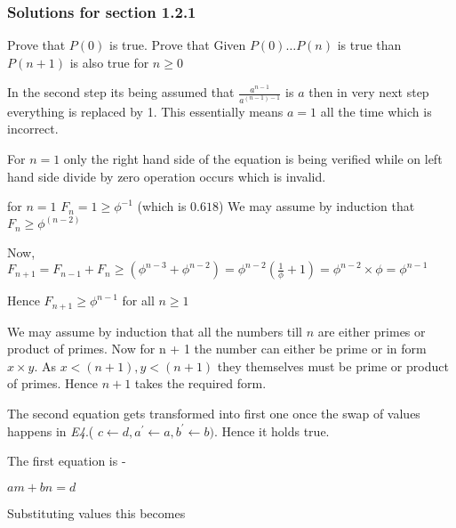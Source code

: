 \documentclass[12pt]{article}
\begin{document}
\subsubsection{Solutions for section 1.2.1}
\begin{enumerate}
  \begin{item}
    Prove that $P(0)$ is true.
    Prove that Given $P(0) \ldots P(n)$ is true than $ P(n+1) $ is also true for $n \ge 0$
  \end{item}

  \begin{item}
    In the second step its being assumed that $ \frac{a^{n-1}}{a^{(n-1)-1}} $ is $a$ then in very next step everything is replaced by 1. This essentially means $a = 1$ all the time which is incorrect.
  \end{item}
  
  \begin{item}
    For $n = 1$ only the right hand side of the equation is being verified while on left hand side divide by zero operation occurs which is invalid.
  \end{item}

  \begin{item}
    for $n=1$ $F_n = 1 \ge \phi^{-1}$ (which is $0.618$)
    We may assume by induction that $F_n \ge \phi^{(n-2)}$

    Now, $F_{n+1} = F_{n-1} + F_n \ge (\phi^{n-3} + \phi^{n-2}) = \phi^{n-2}(\frac{1}{\phi} + 1) =
    \phi^{n-2} \times \phi = \phi^{n-1}$

    Hence $F_{n+1} \ge \phi^{n-1} $ for all $ n \ge 1 $
    
  \end{item}
  \begin{item}
    We may assume by induction that all the numbers till $n$ are either primes or product of primes. Now for n + 1 the number can either be prime or in form $x \times y$. As $x < (n + 1), y < (n+1)$ they themselves must be prime or product of primes. Hence $n+1$ takes the required form.
  \end{item}

  \begin{item}
    The second equation gets transformed into first one once the swap of values happens in {\it{E4}}.( $c \leftarrow d, a^\prime \leftarrow a, b^\prime \leftarrow b )$. Hence it holds true.

    The first equation is -

    $am + bn  = d $

    Substituting values this becomes


\end{item}
\end{enumerate}
\end{document}
